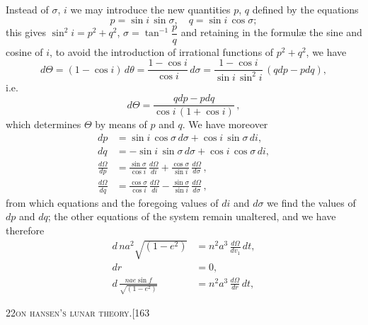 \documentclass[11pt]{article}
\begin{document}
Instead of $\sigma$, $i$ we may introduce the new quantities $p$, $q$ defined by the equations
\[
p = \sin i\,\sin\sigma,\quad q = \sin i\,\cos\sigma;
\]
this gives $\sin^{2}i = p^{2} + q^{2}$, $\sigma = \tan^{-1}\dfrac{p}{q}$ and retaining in the formul\ae{} the sine and cosine
of $i$, to avoid the introduction of irrational functions of $p^{2} + q^{2}$, we have
\[
d\Theta = (1 - \cos i)\,d\theta = \frac{1 - \cos i}{\cos i}\,d\sigma = \frac{1 - \cos i}{\sin i\,\sin^{2}i}\,(qdp - pdq),
\]
i.e.
\[
d\Theta = \frac{qdp - pdq}{\cos i\,(1 + \cos i)}\,,
\]
which determines $\Theta$ by means of $p$ and $q$. We have moreover
\begin{align*}
dp &= \sin i\,\cos\sigma\,d\sigma + \cos i\,\sin\sigma\,di,\\
dq &= -\sin i\,\sin\sigma\,d\sigma + \cos i\,\cos\sigma\,di,\\
\frac{d\Omega}{dp} &= \frac{\sin\sigma}{\cos i}\,\frac{d\Omega}{di} + \frac{\cos\sigma}{\sin i}\,\frac{d\Omega}{d\sigma}\,,\\
\frac{d\Omega}{dq} &= \frac{\cos\sigma}{\cos i}\,\frac{d\Omega}{di} - \frac{\sin\sigma}{\sin i}\,\frac{d\Omega}{d\sigma}\,,
\end{align*}
from which equations and the foregoing values of $di$ and $d\sigma$ we find the values of
$dp$ and $dq$; the other equations of the system remain unaltered, and we have
therefore
\begin{align*}
d\,na^{2}\sqrt{(1-e^{2})} &= n^{2}a^{3}\,\frac{d\Omega}{dv_{1}}\,dt,\\
dr &= 0,\\
d\,\frac{nae\sin f}{\sqrt{(1-e^{2})}} &= n^{2}a^{3}\,\frac{d\Omega}{dr}\,dt,
\end{align*}

\newpage

\begin{center}
\small\textsc{22}\hfill\textsc{on hansen's lunar theory.}\hfill[163
\end{center}

\medskip
\end{document}

